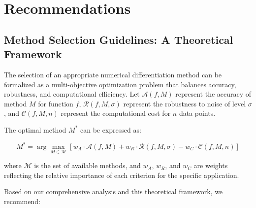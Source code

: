 \documentclass[10pt,journal,compsoc]{IEEEtran}
\begin{document}
\section{Recommendations}

\subsection{Method Selection Guidelines: A Theoretical Framework}

The selection of an appropriate numerical differentiation method can be formalized as a multi-objective optimization problem that balances accuracy, robustness, and computational efficiency. Let $\mathcal{A}(f, M)$ represent the accuracy of method $M$ for function $f$, $\mathcal{R}(f, M, \sigma)$ represent the robustness to noise of level $\sigma$, and $\mathcal{C}(f, M, n)$ represent the computational cost for $n$ data points.

The optimal method $M^*$ can be expressed as:

\begin{equation}
    M^* = \arg\max_{M \in \mathcal{M}} \left[ w_A \cdot \mathcal{A}(f, M) + w_R \cdot \mathcal{R}(f, M, \sigma) - w_C \cdot \mathcal{C}(f, M, n) \right]
\end{equation}

where $\mathcal{M}$ is the set of available methods, and $w_A$, $w_R$, and $w_C$ are weights reflecting the relative importance of each criterion for the specific application.

Based on our comprehensive analysis and this theoretical framework, we recommend:
\end{document}
